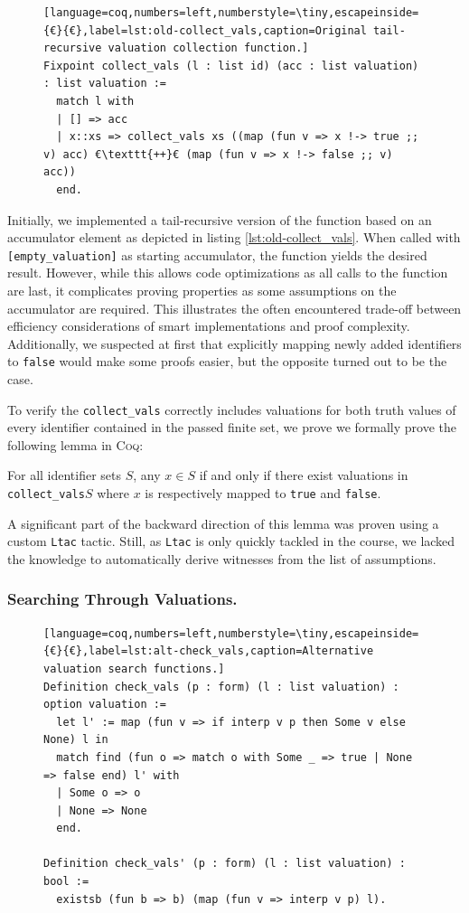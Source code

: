 \begin{figure}[t]
    \begin{lstlisting}[language=coq,numbers=left,numberstyle=\tiny,escapeinside={€}{€},label=lst:old-collect_vals,caption=Original tail-recursive valuation collection function.]
Fixpoint collect_vals (l : list id) (acc : list valuation) : list valuation :=
  match l with
  | [] => acc
  | x::xs => collect_vals xs ((map (fun v => x !-> true ;; v) acc) €\texttt{++}€ (map (fun v => x !-> false ;; v) acc))
  end.
    \end{lstlisting}
\end{figure}

Initially, we implemented a tail-recursive version of the function based on an accumulator element as depicted in listing \ref{lst:old-collect_vals}.
When called with \texttt{[empty\_valuation]} as starting accumulator, the function yields the desired result.
However, while this allows code optimizations as all calls to the function are last, it complicates proving properties as some assumptions on the accumulator are required.
This illustrates the often encountered trade-off between efficiency considerations of smart implementations and proof complexity.
Additionally, we suspected at first that explicitly mapping newly added identifiers to \texttt{false} would make some proofs easier, but the opposite turned out to be the case.

To verify the \texttt{collect\_vals} correctly includes valuations for both truth values of every identifier contained in the passed finite set, we prove we formally prove the following lemma in \textsc{Coq}:
\begin{lemma}
    For all identifier sets $S$, any $x \in S$ if and only if there exist valuations in \texttt{collect\_vals\;$S$} where $x$ is respectively mapped to \texttt{true} and \texttt{false}.
\end{lemma}
A significant part of the backward direction of this lemma was proven using a custom \texttt{Ltac} tactic. 
Still, as \texttt{Ltac} is only quickly tackled in the course, we lacked the knowledge to automatically derive witnesses from the list of assumptions.

\subsubsection{Searching Through Valuations.}

\begin{figure}[t]
    \begin{lstlisting}[language=coq,numbers=left,numberstyle=\tiny,escapeinside={€}{€},label=lst:alt-check_vals,caption=Alternative valuation search functions.]
Definition check_vals (p : form) (l : list valuation) : option valuation :=
  let l' := map (fun v => if interp v p then Some v else None) l in
  match find (fun o => match o with Some _ => true | None => false end) l' with
  | Some o => o
  | None => None
  end.

Definition check_vals' (p : form) (l : list valuation) : bool :=
  existsb (fun b => b) (map (fun v => interp v p) l).
    \end{lstlisting}
\end{figure}

